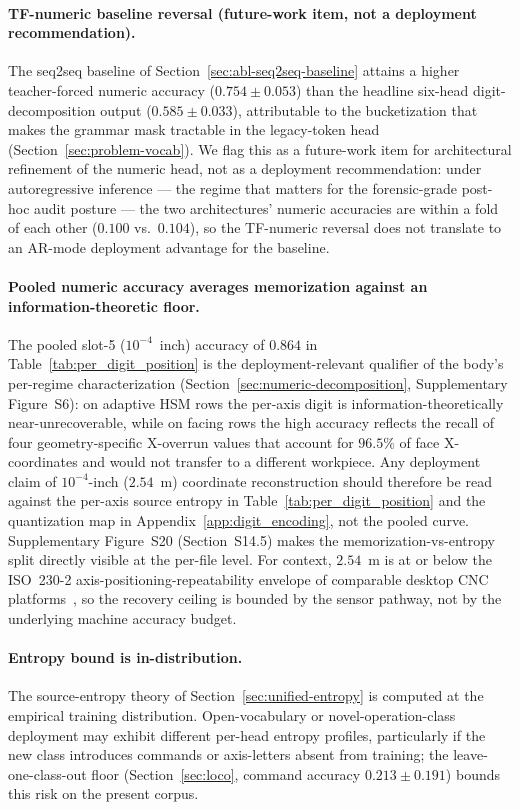 \documentclass[sensors,article,submit,moreauthors,pdftex]{Definitions/mdpi}
\begin{document}
\paragraph{TF-numeric baseline reversal (future-work item, not a deployment recommendation).} The seq2seq baseline of Section~\ref{sec:abl-seq2seq-baseline} attains a higher teacher-forced numeric accuracy ($0.754 \pm 0.053$) than the headline six-head digit-decomposition output ($0.585 \pm 0.033$), attributable to the bucketization that makes the grammar mask tractable in the legacy-token head (Section~\ref{sec:problem-vocab}). We flag this as a future-work item for architectural refinement of the numeric head, not as a deployment recommendation: under autoregressive inference --- the regime that matters for the forensic-grade post-hoc audit posture --- the two architectures' numeric accuracies are within a fold of each other ($0.100$ vs.\ $0.104$), so the TF-numeric reversal does not translate to an AR-mode deployment advantage for the baseline.

\paragraph{Pooled numeric accuracy averages memorization against an information-theoretic floor.} The pooled slot-5 ($10^{-4}$~inch) accuracy of $0.864$ in Table~\ref{tab:per_digit_position} is the deployment-relevant qualifier of the body's per-regime characterization (Section~\ref{sec:numeric-decomposition}, Supplementary Figure~S6): on adaptive HSM rows the per-axis digit is information-theoretically near-unrecoverable, while on facing rows the high accuracy reflects the recall of four geometry-specific X-overrun values that account for $96.5\%$ of face X-coordinates and would not transfer to a different workpiece. Any deployment claim of $10^{-4}$-inch ($2.54$~\textmu m) coordinate reconstruction should therefore be read against the per-axis source entropy in Table~\ref{tab:per_digit_position} and the quantization map in Appendix~\ref{app:digit_encoding}, not the pooled curve. Supplementary Figure~S20 (Section~S14.5) makes the memorization-vs-entropy split directly visible at the per-file level. For context, $2.54$~\textmu m is at or below the ISO~230-2 axis-positioning-repeatability envelope of comparable desktop CNC platforms~\cite{iso230_2}, so the recovery ceiling is bounded by the sensor pathway, not by the underlying machine accuracy budget.

\paragraph{Entropy bound is in-distribution.} The source-entropy theory of Section~\ref{sec:unified-entropy} is computed at the empirical training distribution. Open-vocabulary or novel-operation-class deployment may exhibit different per-head entropy profiles, particularly if the new class introduces commands or axis-letters absent from training; the leave-one-class-out floor (Section~\ref{sec:loco}, command accuracy $0.213 \pm 0.191$) bounds this risk on the present corpus.
\end{document}
